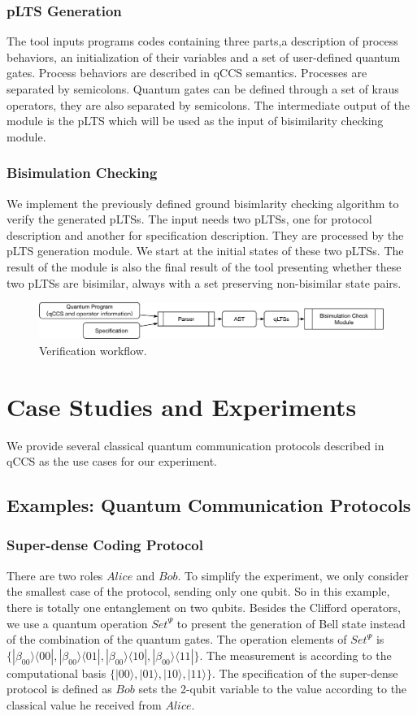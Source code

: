 \documentclass[runningheads]{llncs}
\begin{document}
\subsubsection{pLTS Generation}
The tool inputs programs codes containing three parts,a description of process behaviors, an initialization of their variables and a set of user-defined quantum gates. Process behaviors are described in qCCS semantics. Processes are separated by semicolons. Quantum gates can be defined through a set of kraus operators, they are also separated by semicolons. The intermediate output of the module is the pLTS which will be used as the input of bisimilarity checking module.
\subsubsection{Bisimulation Checking}
We implement the previously defined ground bisimlarity checking algorithm to verify the generated pLTSs. The input needs two pLTSs, one for protocol description and another for specification description. They are processed by the pLTS generation module. We start at the initial states of these two pLTSs. The result of the module is also the final result of the tool presenting whether these two pLTSs are bisimilar, always with a set preserving non-bisimilar state pairs.
\begin{figure}
\centering
\includegraphics[width=\textwidth]{images/architecture.eps}
\caption{Verification workflow.}
\label{fig:arch}
\end{figure}
\section{Case Studies and Experiments}
We provide several classical quantum communication protocols described in qCCS as the use cases for our experiment.
\subsection{Examples: Quantum Communication Protocols}
\subsubsection{Super-dense Coding Protocol} There are two roles $Alice$ and $Bob$. To simplify the experiment, we only consider the smallest case of the protocol, sending only one qubit. So in this example, there is totally one entanglement on two qubits. Besides the Clifford operators, we use a quantum operation $Set^{\Psi}$ to present the generation of Bell state instead of the combination of the quantum gates. The operation elements of $Set^{\Psi}$ is $\{|\beta_{00}\rangle\langle00|,|\beta_{00}\rangle\langle01|,|\beta_{00}\rangle\langle10|,|\beta_{00}\rangle\langle11|\}$. The measurement is according to the computational basis $\{|00\rangle,|01\rangle,|10\rangle,|11\rangle\}$. The specification of the super-dense protocol is defined as $Bob$ sets the 2-qubit variable to the value according to the classical value he received from $Alice$.
\end{document}

